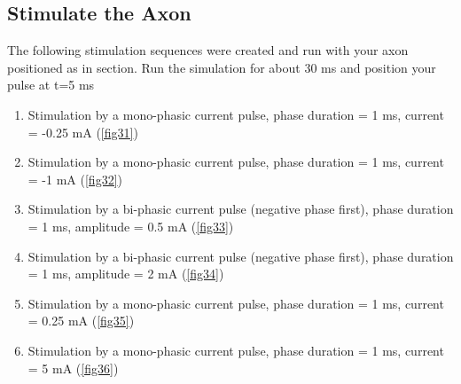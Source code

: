 \documentclass{scrartcl}			%
\begin{document}
\subsection{Stimulate the Axon}
The following stimulation sequences were created and run with your axon positioned as in section. Run the simulation for about 30 ms and position your pulse at t=5 ms
\begin{enumerate}
	\item Stimulation by a mono-phasic current pulse, phase duration = 1 ms, current = -0.25 mA (\ref{fig31})
	\item Stimulation by a mono-phasic current pulse, phase duration = 1 ms, current = -1 mA (\ref{fig32})
	\item Stimulation by a bi-phasic current pulse (negative phase first), phase duration = 1 ms, amplitude = 0.5 mA (\ref{fig33})
	\item Stimulation by a bi-phasic current pulse (negative phase first), phase duration = 1 ms, amplitude = 2 mA (\ref{fig34})
	\item Stimulation by a mono-phasic current pulse, phase duration = 1 ms, current = 0.25 mA (\ref{fig35})
	\item Stimulation by a mono-phasic current pulse, phase duration = 1 ms, current = 5 mA (\ref{fig36})
\end{enumerate}
\end{document}

